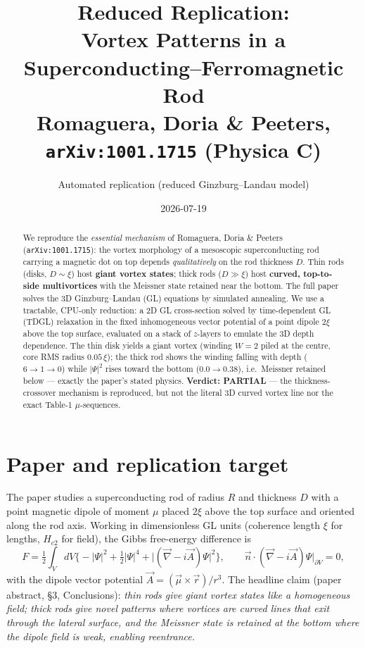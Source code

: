 \documentclass[11pt]{article}
\title{\textbf{Reduced Replication:\\ Vortex Patterns in a Superconducting--Ferromagnetic Rod}\\[4pt]
\large Romaguera, Doria \& Peeters, \texttt{arXiv:1001.1715} (Physica C)}
\author{Automated replication (reduced Ginzburg--Landau model)}
\date{2026-07-19}
\begin{document}
\maketitle

\begin{abstract}
We reproduce the \emph{essential mechanism} of Romaguera, Doria \& Peeters
(\texttt{arXiv:1001.1715}): the vortex morphology of a mesoscopic superconducting
rod carrying a magnetic dot on top depends \emph{qualitatively} on the rod
thickness $D$. Thin rods (disks, $D\!\sim\!\xi$) host \textbf{giant vortex
states}; thick rods ($D\!\gg\!\xi$) host \textbf{curved, top-to-side
multivortices} with the Meissner state retained near the bottom. The full paper
solves the 3D Ginzburg--Landau (GL) equations by simulated annealing. We use a
tractable, CPU-only reduction: a 2D GL cross-section solved by time-dependent GL
(TDGL) relaxation in the fixed inhomogeneous vector potential of a point dipole
$2\xi$ above the top surface, evaluated on a stack of $z$-layers to emulate the
3D depth dependence. The thin disk yields a giant vortex (winding $W{=}2$ piled
at the centre, core RMS radius $0.05\,\xi$); the thick rod shows the winding
falling with depth ($6\!\to\!1\!\to\!0$) while $|\Psi|^2$ rises toward the bottom
($0.0\!\to\!0.38$), i.e.\ Meissner retained below --- exactly the paper's stated
physics. \textbf{Verdict: PARTIAL} --- the thickness-crossover mechanism is
reproduced, but not the literal 3D curved vortex line nor the exact Table-1
$\mu$-sequences.
\end{abstract}

\section{Paper and replication target}
The paper studies a superconducting rod of radius $R$ and thickness $D$ with a
point magnetic dipole of moment $\mu$ placed $2\xi$ above the top surface and
oriented along the rod axis. Working in dimensionless GL units (coherence length
$\xi$ for lengths, $H_{c2}$ for field), the Gibbs free-energy difference is
\begin{equation}
F=\tfrac12\int_V dV\Big\{-|\Psi|^2+\tfrac12|\Psi|^4
+\big|(\vec\nabla-i\vec A)\Psi\big|^2\Big\},
\qquad
\vec n\cdot(\vec\nabla-i\vec A)\Psi\big|_{\partial V}=0,
\end{equation}
with the dipole vector potential $\vec A=(\vec\mu\times\vec r)/r^3$. The headline
claim (paper abstract, \S3, Conclusions): \emph{thin rods give giant vortex
states like a homogeneous field; thick rods give novel patterns where vortices
are curved lines that exit through the lateral surface, and the Meissner state is
retained at the bottom where the dipole field is weak, enabling reentrance.}
\end{document}
